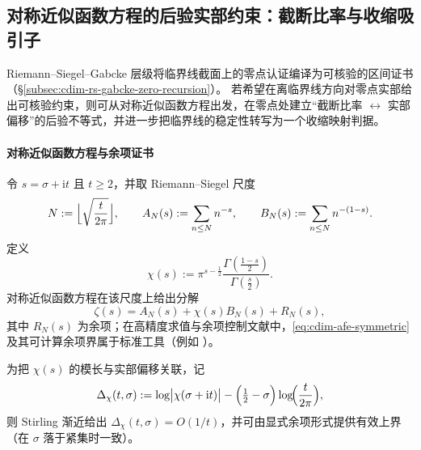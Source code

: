 \subsection{对称近似函数方程的后验实部约束：截断比率与收缩吸引子}\label{subsec:cdim-afe-posterior-sigma-contraction}
Riemann--Siegel--Gabcke 层级将临界线截面上的零点认证编译为可核验的区间证书（\S\ref{subsec:cdim-rs-gabcke-zero-recursion}）。
若希望在离临界线方向对零点实部给出可核验约束，则可从对称近似函数方程出发，在零点处建立“截断比率 \(\leftrightarrow\) 实部偏移”的后验不等式，并进一步把临界线的稳定性转写为一个收缩映射判据。

\paragraph{对称近似函数方程与余项证书}
令 \(s=\sigma+\mathrm{i}t\) 且 \(t\ge 2\)，并取 Riemann--Siegel 尺度
\[
N:=\Bigl\lfloor \sqrt{\frac{t}{2\pi}}\Bigr\rfloor,
\qquad
A_N(s):=\sum_{n\le N}n^{-s},
\qquad
B_N(s):=\sum_{n\le N}n^{-(1-s)}.
\]
定义
\begin{equation}\label{eq:cdim-afe-chi-def}
\chi(s):=\pi^{s-\frac12}\frac{\Gamma\!\left(\frac{1-s}{2}\right)}{\Gamma\!\left(\frac{s}{2}\right)}.
\end{equation}
对称近似函数方程在该尺度上给出分解
\begin{equation}\label{eq:cdim-afe-symmetric}
\zeta(s)=A_N(s)+\chi(s)B_N(s)+R_N(s),
\end{equation}
其中 \(R_N(s)\) 为余项；在高精度求值与余项控制文献中，\eqref{eq:cdim-afe-symmetric} 及其可计算余项界属于标准工具（例如 \cite{Titchmarsh1986RiemannZeta,Hiary2011FastZeta}）。

为把 \(\chi(s)\) 的模长与实部偏移关联，记
\begin{equation}\label{eq:cdim-afe-logchi-stirling}
\Delta_\chi(t,\sigma):=\log\bigl|\chi(\sigma+\mathrm{i}t)\bigr|-\Bigl(\tfrac12-\sigma\Bigr)\log\!\Bigl(\frac{t}{2\pi}\Bigr),
\end{equation}
则 Stirling 渐近给出 \(\Delta_\chi(t,\sigma)=O(1/t)\)，并可由显式余项形式提供有效上界（在 \(\sigma\) 落于紧集时一致）。

